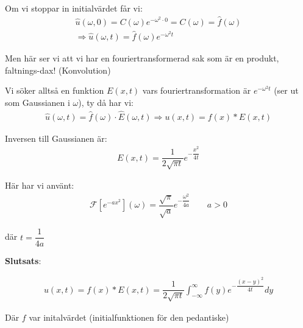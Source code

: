\par\bigskip
\noindent Om vi stoppar in initialvärdet får vi:
\begin{equation*}
  \begin{gathered}
    \hat{u}(\omega,0) = C(\omega)e^{-\omega^2\cdot0} = C(\omega) = \hat{f}(\omega)\\
    \Rightarrow\hat{u}(\omega,t) = \hat{f}(\omega)e^{-\omega^2t}
  \end{gathered}
\end{equation*}
\par\bigskip
\noindent Men här ser vi att vi har en fouriertransformerad sak som är en produkt, faltnings-dax! (Konvolution)
\par\bigskip
\noindent Vi söker alltså en funktion $E(x,t)$  vars fouriertransformation är $e^{-\omega^2t}$ (ser ut som Gaussianen i $\omega$), ty då har vi:
\begin{equation*}
  \begin{gathered}
    \hat{u}(\omega,t) = \hat{f}(\omega)\cdot \hat{E}(\omega,t)\Rightarrow u(x,t) = f(x)*E(x,t)
  \end{gathered}
\end{equation*}
\par\bigskip
\noindent Inversen till Gaussianen är:
\begin{equation*}
  \begin{gathered}
    E(x,t) = \dfrac{1}{2\sqrt{\pi t}}e^{-\dfrac{x^2}{4t}}
  \end{gathered}
\end{equation*}\par
\noindent Här har vi använt:
\begin{equation*}
  \begin{gathered}
    \mathcal{F}\left[e^{-ax^2}\right](\omega) = \dfrac{\sqrt{\pi}}{\sqrt{a}}e^{-\dfrac{\omega^2}{4a}}\qquad a>0
  \end{gathered}
\end{equation*}\par
\noindent där $t = \dfrac{1}{4a}$
\par\bigskip
\noindent\textbf{Slutsats}:\par
\begin{equation*}
  \begin{gathered}
    u(x,t) = f(x)*E(x,t) = \dfrac{1}{2\sqrt{\pi t}}\int_{-\infty}^{\infty}f(y)e^{-\dfrac{(x-y)^2}{4t}}dy
  \end{gathered}
\end{equation*}
\par\bigskip
\noindent Där $f$ var initalvärdet (initialfunktionen för den pedantiske)
